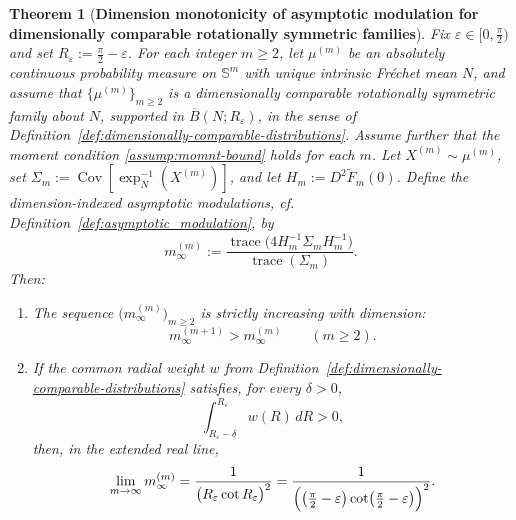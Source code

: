 \documentclass{amsart}
\newtheorem{theorem}{Theorem}[section]
\theoremstyle{definition}
\theoremstyle{remark}
\newcommand\0{\boldsymbol{0}}
\begin{document}
\begin{theorem}[\textbf{Dimension monotonicity of asymptotic modulation for dimensionally comparable rotationally symmetric families}]
\label{thm:dim_monotone_modulation_rot}
Fix \(\varepsilon\in[0,\frac{\pi}{2})\) and set \(R_\varepsilon:=\frac{\pi}{2}-\varepsilon\).  For each integer \(m\ge2\), let \(\mu^{(m)}\) be an absolutely continuous probability measure on \(\mathbb S^m\) with unique intrinsic Fr\'echet mean \(N\), and assume that \(\{\mu^{(m)}\}_{m\ge2}\) is a dimensionally comparable rotationally symmetric family about \(N\), supported in \(\overline B(N;R_\varepsilon)\), in the sense of Definition~\ref{def:dimensionally-comparable-distributions}.  Assume further that the moment condition \ref{assump:momnt-bound} holds for each \(m\).  Let \(X^{(m)}\sim\mu^{(m)}\), set \(\Sigma_m:=\operatorname{Cov}[\exp_N^{-1}(X^{(m)})]\), and let \(H_m:=D^2\widetilde F_m(0)\).  Define the dimension-indexed asymptotic modulations, cf. Definition~\ref{def:asymptotic_modulation}, by
\[
m_\infty^{(m)}
:=
\frac{\operatorname{trace}\!\bigl(4H_m^{-1}\Sigma_m H_m^{-1}\bigr)}{\operatorname{trace}(\Sigma_m)}.
\]
Then:
\begin{enumerate}
\item The sequence \(\bigl(m_\infty^{(m)}\bigr)_{m\ge2}\) is strictly increasing with dimension:
\[
m_\infty^{(m+1)} > m_\infty^{(m)}
\qquad (m\ge2).
\]

\item If the common radial weight \(w\) from Definition~\ref{def:dimensionally-comparable-distributions} satisfies, for every \(\delta>0\),
\[
\int_{R_\varepsilon-\delta}^{R_\varepsilon} w(R)\,dR > 0,
\]
then, in the extended real line,
\[
\lim_{m\to\infty} m_\infty^{(m)}
=
\frac{1}{\bigl(R_\varepsilon \cot R_\varepsilon\bigr)^2}
=
\frac{1}{\Bigl(\left(\frac{\pi}{2}-\varepsilon\right)\cot\!\left(\frac{\pi}{2}-\varepsilon\right)\Bigr)^2}.
\]
\end{enumerate}
\end{theorem}
\end{document}
